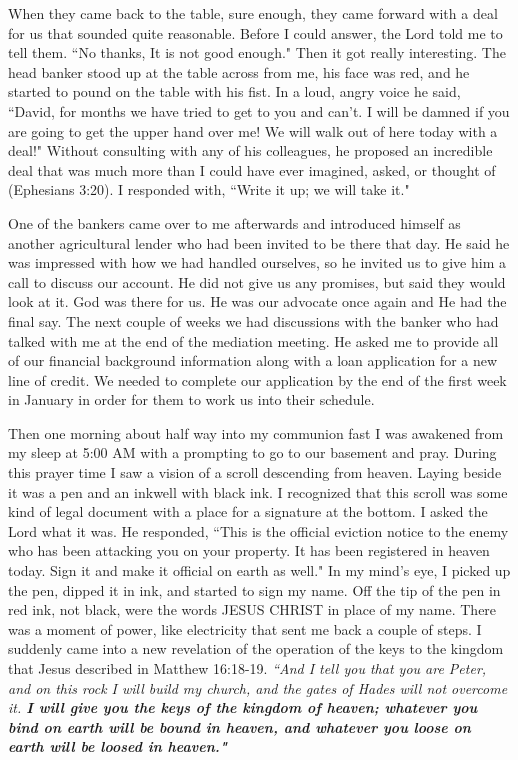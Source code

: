 \documentclass[oneside]{book}
\begin{document}
When they came back to the table, sure enough, they came forward with a deal for us that sounded quite reasonable. Before I could answer, the Lord told me to tell them. ``No thanks, It is not good enough." Then it got really interesting. The head banker stood up at the table across from me, his face was red, and he started to pound on the table with his fist. In a loud, angry voice he said, ``David, for months we have tried to get to you and can't. I will be damned if you are going to get the upper hand over me! We will walk out of here today with a deal!" Without consulting with any of his colleagues, he proposed an incredible deal that was much more than I could have ever imagined, asked, or thought of (Ephesians 3:20). I responded with, ``Write it up; we will take it." 

One of the bankers came over to me afterwards and introduced himself as another agricultural lender who had been invited to be there that day. He said he was impressed with how we had handled ourselves, so he invited us to give him a call to discuss our account. He did not give us any promises, but said they would look at it. God was there for us. He was our advocate once again and He had the final say. The next couple of weeks we had discussions with the banker who had talked with me at the end of the mediation meeting. He asked me to provide all of our financial background information along with a loan application for a new line of credit. We needed to complete our application by the end of the first week in January in order for them to work us into their schedule.

Then one morning about half way into my communion fast I was awakened from my sleep at 5:00 AM with a prompting to go to our basement and pray. During this prayer time I saw a vision of a scroll descending from heaven. Laying beside it was a pen and an inkwell with black ink. I recognized that this scroll was some kind of legal document with a place for a signature at the bottom. I asked the Lord what it was. He responded, ``This is the official eviction notice to the enemy who has been attacking you on your property. It has been registered in heaven today. Sign it and make it official on earth as well." In my mind's eye, I picked up the pen, dipped it in ink, and started to sign my name. Off the tip of the pen in red ink, not black, were the words JESUS CHRIST in place of my name. There was a moment of power, like electricity that sent me back a couple of steps. I suddenly came into a new revelation of the operation of the keys to the kingdom that Jesus described in Matthew 16:18-19. \textit{``And I tell you that you are Peter, and on this rock I will build my church, and the gates of Hades will not overcome it. \textbf{I will give you the keys of the kingdom of heaven; whatever you bind on earth will be bound in heaven, and whatever you loose on earth will be loosed in heaven."}} 
\end{document}
